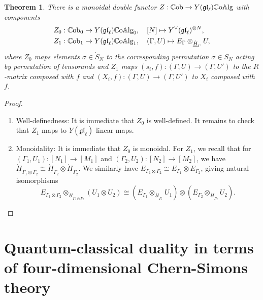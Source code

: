 \documentclass[11pt]{report}
\newtheorem{theorem}{Theorem}[section]
\theoremstyle{definition}
\theoremstyle{remark}
\theoremstyle{remark}
\begin{document}
\begin{theorem}
There is a monoidal double functor $Z: \mathbb{C}\textnormal{ob} \to Y(\mathfrak{gl}_\ell)\mathbb{C}\textnormal{o}\mathbb{A}\textnormal{lg}$ with components
\begin{align*}
Z_0&: \mathbb{C}\textnormal{ob}_0 \to Y(\mathfrak{gl}_\ell)\mathbb{C}\textnormal{o}\mathbb{A}\textnormal{lg}_0, \quad [N] \mapsto Y^\vee(\mathfrak{gl}_\ell)^{\otimes N}, \\
Z_1&: \mathbb{C}\textnormal{ob}_1 \to Y(\mathfrak{gl}_\ell)\mathbb{C}\textnormal{o}\mathbb{A}\textnormal{lg}_1, \quad (\Gamma,U) \mapsto E_\Gamma \otimes_{\underline{\dot H}_\Gamma} U,
\end{align*}
where $Z_0$ maps elements $\sigma \in \dot S_N$ to the corresponding permutation $\bar \sigma \in S_N$ acting by permutation of tensorands and $Z_1$ maps $(s_i,f): (\Gamma,U) \to (\Gamma,U')$ to the $R$-matrix composed with $f$ and $(X_i,f): (\Gamma,U) \to (\Gamma,U')$ to $X_i$ composed with $f$.
\end{theorem}

\begin{proof}
\begin{enumerate}[label=(\roman*)]
\item Well-definedness: It is immediate that $Z_0$ is well-defined. It remains to check that $Z_1$ maps to $Y(\mathfrak{gl}_\ell)$-linear maps.
\item Monoidality: It is immediate that $Z_0$ is monoidal. For $Z_1$, we recall that for $(\Gamma_1,U_1): [N_1] \to [M_1]$ and $(\Gamma_2,U_2):[N_2] \to [M_2]$, we have $\underline{\dot H}_{\Gamma_1 \otimes \Gamma_2} \cong \underline{\dot H}_{\Gamma_2} \otimes \underline{\dot H}_{\Gamma_2}$. We similarly have $E_{\Gamma_1 \otimes \Gamma_2} \cong E_{\Gamma_1} \otimes E_{\Gamma_2}$, giving natural isomorphisms
\begin{equation*}
E_{\Gamma_1 \otimes \Gamma_2} \otimes_{\underline{\dot H}_{\Gamma_1 \otimes \Gamma_2}} (U_1 \otimes U_2) \cong (E_{\Gamma_1} \otimes_{\underline{\dot H}_{\Gamma_1}} U_1) \otimes (E_{\Gamma_2} \otimes_{\underline{\dot H}_{\Gamma_2}} U_2).
\end{equation*}
\end{enumerate}
\end{proof}

\section{Quantum-classical duality in terms of four-dimensional Chern-Simons theory}
\end{document}
